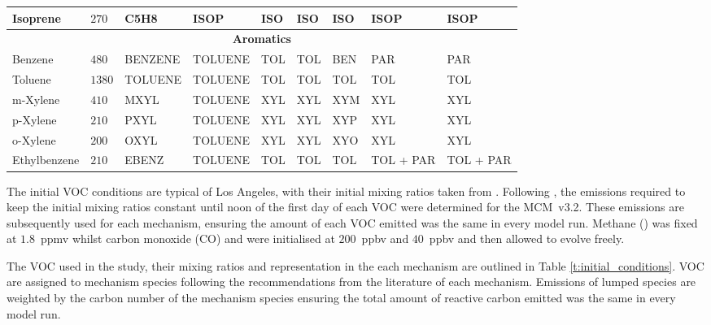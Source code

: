 \begin{sidewaystable}
\begin{tabular}{lllllllll}
        Isoprene & $270$ & C5H8 & ISOP & ISO & ISO & ISO & ISOP & ISOP \\ \hline
        \multicolumn{9}{c}{\textbf{Aromatics}} \\ \hline 
        Benzene & $480$ & BENZENE & TOLUENE & TOL & TOL & BEN & PAR & PAR \\
        Toluene & $1380$ & TOLUENE & TOLUENE & TOL & TOL & TOL & TOL & TOL \\
        m-Xylene & $410$ & MXYL & TOLUENE & XYL & XYL & XYM & XYL & XYL \\
        p-Xylene & $210$ & PXYL & TOLUENE & XYL & XYL & XYP & XYL & XYL \\
        o-Xylene & $200$ & OXYL & TOLUENE & XYL & XYL & XYO & XYL & XYL \\
        Ethylbenzene & $210$ & EBENZ & TOLUENE & TOL & TOL & TOL & TOL + PAR & TOL + PAR \\ \hline \hline
    \end{tabular}
    \vspace{1mm}
    \caption{VOC present in Los Angeles, mixing ratios taken from \citet{Baker:2008} and their representation in each chemical mechanism. The representation of the VOC in each mechanism is based upon the recommendations of the literature for each mechanism.}
    \vspace{-4mm}
    \label{t:initial_conditions}
\end{sidewaystable}

The initial VOC conditions are typical of Los Angeles, with their initial mixing ratios taken from \citet{Baker:2008}. 
Following \citet{Butler:2011}, the emissions required to keep the initial mixing ratios constant until noon of the first day of each VOC were determined for the \mbox{MCM v3.2.}
These emissions are subsequently used for each mechanism, ensuring the amount of each VOC emitted was the same in every model run.
Methane () was fixed at \mbox{$1.8$ ppmv} whilst carbon monoxide (CO) and  were initialised at \mbox{$200$ ppbv} and \mbox{$40$ ppbv} and then allowed to evolve freely.

The VOC used in the study, their mixing ratios and representation in the each mechanism are outlined in Table \ref{t:initial_conditions}.
VOC are assigned to mechanism species following the recommendations from the literature of each mechanism.
Emissions of lumped species are weighted by the carbon number of the mechanism species ensuring the total amount of reactive carbon emitted was the same in every model run.

